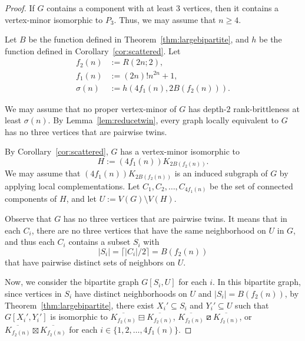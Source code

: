 \documentclass[11pt]{article}
\newcommand\abs[1]{\lvert #1\rvert}
\newcommand\mat{\boxminus}
\newcommand\tri{\boxslash}
\newcommand\antimat{\boxtimes}
\def\S_#1{\overline{K_{#1}}}
\begin{document}
		\begin{proof}
		If $G$ contains a component with at least $3$ vertices, then it contains a vertex-minor isomorphic to $P_3$.
		Thus, we may assume that $n\ge 4$.
		
		Let $B$ be the function defined in Theorem~\ref{thm:largebipartite}, 
                and $h$ be the function defined in Corollary~\ref{cor:scattered}.
                Let
                \begin{align*}
                  f_2(n)&:=R(2n;2),\\
		 f_1(n)&:= (2n)! n^{2n}+1 , \\
		 \sigma(n)&:=h(4f_1(n),2B(f_2(n))).
                \end{align*}


                We may assume that no proper vertex-minor of $G$
                has depth-$2$ rank-brittleness at least $\sigma(n)$.
		By Lemma~\ref{lem:reducetwin},
                every graph locally equivalent to $G$ has no three vertices that are pairwise twins.
		
                By Corollary~\ref{cor:scattered}, 
                $G$ has a vertex-minor isomorphic to 
                \[H:=(4f_1(n)) K_{2B(f_2(n))}.\]
                We may assume that
                $(4f_1(n)) K_{2B(f_2(n))}$ is an induced subgraph of $G$
                by applying local complementations.
		Let $C_1, C_2, \ldots, C_{4f_1(n)}$ be the set of connected components of $H$, and let $U:=V(G)\setminus V(H)$.
		
		Observe that 
		$G$ has no three vertices that are pairwise twins.
		It means that in each $C_i$, there are no three vertices that have the same neighborhood on $U$ in $G$, and 
		thus each $C_i$ contains a subset $S_i$ with  \[\abs{S_i}=\lceil {\abs{C_i}}/2\rceil=B( f_2(n) )\] that have pairwise distinct
                sets of neighbors on $U$.

%
		
		Now, we consider the bipartite graph $G[S_i, U]$ for each $i$. 
		In this bipartite graph, since vertices in $S_i$ have distinct neighborhoods on $U$ and $\abs{S_i}=B( f_2(n) )$, 
		by Theorem~\ref{thm:largebipartite}, 
		there exist $X_i'\subseteq S_i$ and $Y_i'\subseteq U$ such that
		$G[X_i', Y_i']$ is isomorphic to $\S_{f_2(n)}\mat\S_{f_2(n)}$, $\S_{f_2(n)}\tri \S_{f_2(n)}$, or
                $\S_{f_2(n)}\antimat\S_{f_2(n)}$
                for each $i\in\{1,2,\ldots,4f_1(n)\}$.
      


\end{proof}
\end{document}
